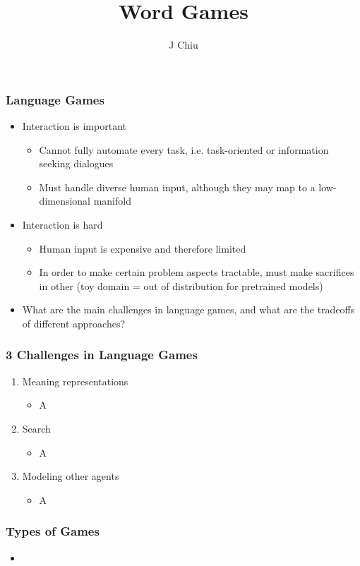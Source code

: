 \documentclass{beamer}
\title{Word Games}
\author{J Chiu}
\begin{document}
\begin{frame}[plain]
\titlepage
\end{frame}

\begin{frame}
\frametitle{Language Games}
\begin{itemize}
\item Interaction is important 
    \begin{itemize}
    \item Cannot fully automate every task,
        i.e. task-oriented or information seeking dialogues
    \item Must handle diverse human input, although they may map
        to a low-dimensional manifold
    \end{itemize}
\item Interaction is hard 
    \begin{itemize}
    \item Human input is expensive and therefore limited
    \item In order to make certain problem aspects tractable,
        must make sacrifices in other
        (toy domain = out of distribution for pretrained models)
    \end{itemize}
\item What are the main challenges in language games,
    and what are the tradeoffs of different approaches?
\end{itemize}
\end{frame}

\begin{frame}
\frametitle{3 Challenges in Language Games}
\begin{enumerate}
\item Meaning representations
    \begin{itemize}
    \item A
    \end{itemize}
\item Search
    \begin{itemize}
    \item A
    \end{itemize}
\item Modeling other agents
    \begin{itemize}
    \item A
    \end{itemize}
\end{enumerate}
\end{frame}

\begin{frame}
\frametitle{Types of Games}
\begin{itemize}
\item 
\end{itemize}
\end{frame}
\end{document}
